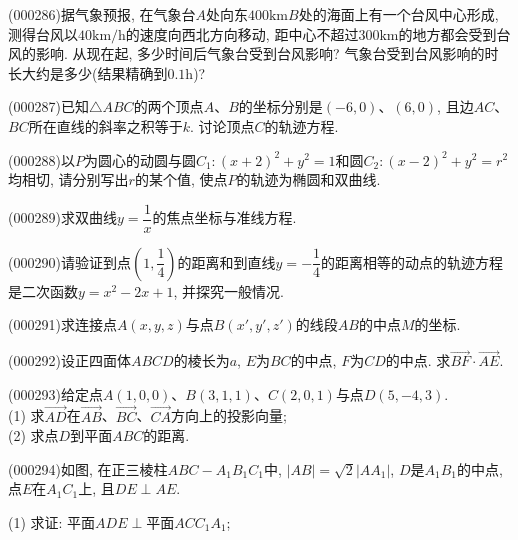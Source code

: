 \item (000286)据气象预报, 在气象台$A$处向东$400\text{km}B$处的海面上有一个台风中心形成, 测得台风以$40\text{km}/\text{h}$的速度向西北方向移动, 距中心不超过$300\text{km}$的地方都会受到台风的影响. 从现在起, 多少时间后气象台受到台风影响?  气象台受到台风影响的时长大约是多少(结果精确到$0.1\text{h}$)?
\item (000287)已知$\triangle ABC$的两个顶点$A$、$B$的坐标分别是$(-6, 0)$、$(6, 0)$, 且边$AC$、$BC$所在直线的斜率之积等于$k$. 讨论顶点$C$的轨迹方程.
\item (000288)以$P$为圆心的动圆与圆$C_1: (x+2)^2+y^2=1$和圆$C_2: (x-2)^2+y^2=r^2$均相切, 请分别写出$r$的某个值, 使点$P$的轨迹为椭圆和双曲线.
\item (000289)求双曲线$y=\dfrac 1x$的焦点坐标与准线方程.
\item (000290)请验证到点$(1, \dfrac 14)$的距离和到直线$y=-\dfrac 14$的距离相等的动点的轨迹方程是二次函数$y=x^2-2x+1$, 并探究一般情况.
\item (000291)求连接点$A(x, y, z)$与点$B(x', y', z')$的线段$AB$的中点$M$的坐标.
\item (000292)设正四面体$ABCD$的棱长为$a$, $E$为$BC$的中点, $F$为$CD$的中点. 求$\overrightarrow{BF}\cdot\overrightarrow{AE}$.
\item (000293)给定点$A(1, 0, 0)$、$B(3, 1, 1)$、$C(2, 0, 1)$与点$D(5, -4, 3)$.\\
(1) 求$\overrightarrow{AD}$在$\overrightarrow{AB}$、$\overrightarrow{BC}$、$\overrightarrow{CA}$方向上的投影向量;\\
(2) 求点$D$到平面$ABC$的距离.
\item (000294)如图, 在正三棱柱$ABC-A_1B_1C_1$中, $|AB|=\sqrt 2|AA_1|$, $D$是$A_1B_1$的中点, 点$E$在$A_1C_1$上, 且$DE\perp AE$.
\begin{center}
\end{center}
(1) 求证: $\text{平面}ADE\perp \text{平面}ACC_1A_1$;\\

